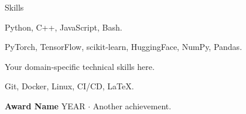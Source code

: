 \begin{rubric}{Skills}

\entry*[Programming]%
    Python, C++, JavaScript, Bash.  %

%
    PyTorch, TensorFlow, scikit-learn, HuggingFace, NumPy, Pandas.

    Your domain-specific technical skills here.

%
    Git, Docker, Linux, CI/CD, \LaTeX.

\entry*[Awards]%
    \textbf{Award Name} YEAR $\cdot$ Another achievement.

\end{rubric}
